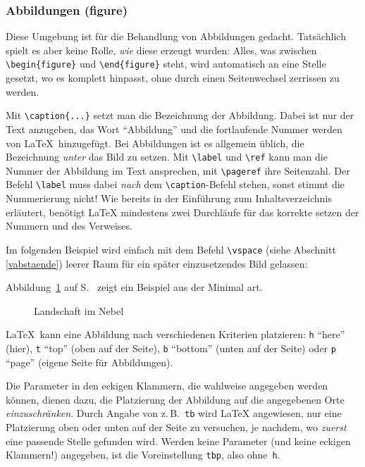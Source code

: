 \subsubsection{Abbildungen (figure)}
Diese Umgebung ist für die Behandlung von Abbildungen gedacht.
Tatsächlich spielt es aber keine Rolle, \emph{wie} diese erzeugt wurden:
Alles, was zwischen
\lstinline|\begin{figure}| und \lstinline|\end{figure}|
steht, wird automatisch an eine Stelle
gesetzt, wo es komplett hinpasst, ohne durch einen Seitenwechsel
zerrissen zu werden.

Mit \lstinline|\caption{...}| setzt man die Bezeichnung der Abbildung.
Dabei ist nur der Text anzugeben, das Wort "`Abbildung"' und die
fortlaufende Nummer werden von \LaTeX\ hinzugefügt.
Bei Abbildungen ist es allgemein üblich, die Bezeichnung
\emph{unter} das Bild zu setzen.
Mit \lstinline|\label| und \lstinline|\ref| kann man die Nummer der
Abbildung im Text ansprechen, mit \lstinline|\pageref| ihre Seitenzahl.
Der Befehl \lstinline:\label: muss dabei \emph{nach} dem \lstinline:\caption:-Befehl
stehen, sonst stimmt die Nummerierung nicht! Wie bereits in der Einführung zum Inhaltsverzeichnis
erläutert, benötigt \LaTeX{} mindestens zwei Durchläufe für das korrekte setzen der Nummern und
des Verweises.

Im folgenden Beispiel wird einfach mit dem Befehl \lstinline|\vspace|
(siehe Abschnitt \ref{vabstaende})
leerer Raum für ein später einzusetzendes Bild gelassen:%

\begin{LTXexample}[preset=\let\label\origlabel]
Abbildung~\ref{weiss} auf
S.~\pageref{weiss} zeigt
ein Beispiel aus der 
Minimal art.
\begin{figure}[!htb]
\centering
\vspace*{1cm}
\caption{Landschaft im
Nebel} \label{weiss}
\end{figure}
\end{LTXexample}


\LaTeX\ kann eine Abbildung nach verschiedenen Kriterien platzieren:
\texttt{h} "`here"' (hier),
\texttt{t} "`top"' (oben auf der Seite), \texttt{b} "`bottom"' (unten
auf der Seite) oder \texttt{p} "`page"' (eigene Seite für
Abbildungen).

Die Parameter in den eckigen Klammern, die wahlweise angegeben
werden können, dienen dazu, die Platzierung der Abbildung auf die
angegebenen Orte \emph{einzuschränken}.  Durch Angabe von
z.\,B.\ \texttt{tb}
wird \LaTeX{} angewiesen, nur eine Platzierung oben oder unten auf der
Seite zu versuchen, je nachdem,
wo \emph{zuerst} eine passende Stelle gefunden wird.
Werden keine Parameter (und keine eckigen
Klammern!) angegeben, ist die Voreinstellung \texttt{tbp},
also ohne~\texttt{h}.

